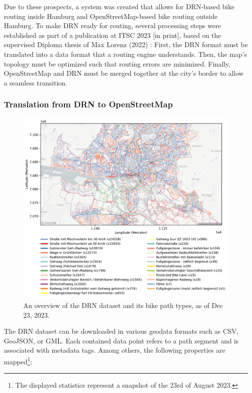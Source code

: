 Due to these prospects, a system was created that allows for DRN-based bike routing inside Hamburg and OpenStreetMap-based bike routing outside Hamburg. To make DRN ready for routing, several processing steps were established as part of a publication at ITSC 2023 [in print], based on the supervised Diploma thesis of Max Lorenz (2022) \cite{lorenz_2022}: First, the DRN format must be translated into a data format that a routing engine understands. Then, the map's topology must be optimized such that routing errors are minimized. Finally, OpenStreetMap and DRN must be merged together at the city's border to allow a seamless transition.

\subsubsection{Translation from DRN to OpenStreetMap}

\begin{figure}[htbp]
\centering
\includegraphics[width=\linewidth]{images/routing-drn.pdf}
\caption{An overview of the DRN dataset and its bike path types, as of Dec 23, 2023.}
\label{fig:drn-map}
\end{figure}

The DRN dataset can be downloaded in various geodata formats such as CSV, GeoJSON, or GML. Each contained data point refers to a path segment and is associated with metadata tags. Among others, the following properties are mapped\footnote{The displayed statistics represent a snapshot of the 23rd of August 2023.}:

